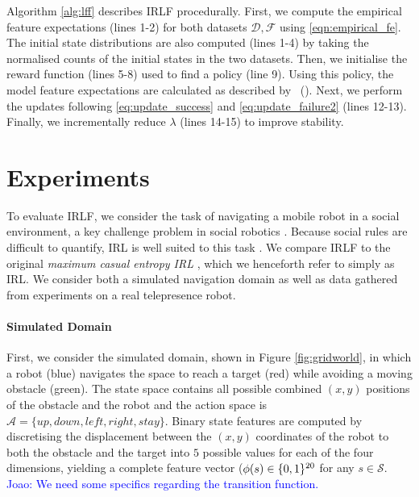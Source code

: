 \documentclass[letterpaper]{article}
\newcommand{\citet}[1]{\citeauthor{#1}~(\citeyear{#1})}
\newcommand{\jm}[1]{\textcolor{blue}{Joao: #1}}
\newcommand{\jm}[1]{}
\begin{document}
Algorithm \ref{alg:lff} describes IRLF procedurally. First, we compute the empirical feature expectations (lines 1-2) for both datasets $\mathcal{D},\mathcal{F}$ using \eqref{eqn:empirical_fe}.	The initial state distributions are also computed (lines 1-4) by taking the normalised counts of the initial states in the two datasets. Then, we initialise the reward function (lines 5-8) used to find a policy (line 9). Using this policy, the model feature expectations are calculated as described by \citet{ziebart2013principle}. Next, we perform the updates following \eqref{eq:update_success} and \eqref{eq:update_failure2} (lines 12-13). Finally, we incrementally reduce $\lambda$ (lines 14-15) to improve stability.

\section{Experiments}

To evaluate IRLF, we consider the task of navigating a mobile robot in a social environment, a key challenge problem in social robotics \cite{pacchierotti2006embodied}. Because social rules are difficult to quantify, IRL is well suited to this task \cite{henry2010learning,vasquez2014inverse}.  We compare IRLF to the original \emph{maximum casual entropy IRL} \cite{ziebart2008maximum}, which we henceforth refer to simply as IRL.  We  consider both a simulated navigation domain as well as data gathered from experiments on a real telepresence robot.
\vspace{-4mm}
\paragraph{Simulated Domain}

First, we consider the simulated domain, shown in Figure \ref{fig:gridworld}, in which a robot (blue) navigates the space to reach a target (red) while avoiding a moving
obstacle (green). The state space contains all possible combined $(x,y)$ positions of the obstacle and the robot and the action space is $\mathcal{A} = \{up,down,left,right,stay\}$. Binary state features are computed by discretising the displacement between the $(x,y)$ coordinates of the robot to both the obstacle and the target into $5$ possible values for each of the four dimensions, yielding a complete feature vector ($\phi(s)\in\mathbb \{0,1\}^{20}$ for any $s\in\mathcal{S}$. \jm{We need some specifics regarding the transition function.}
\end{document}
